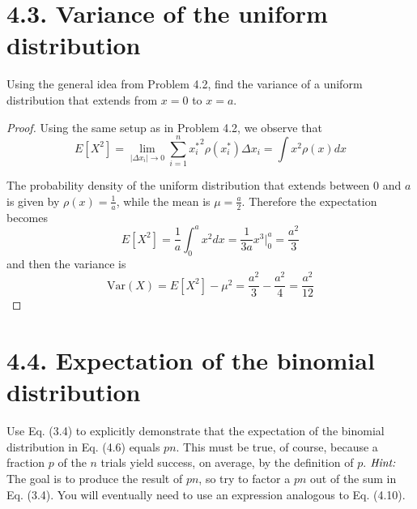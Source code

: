 \section*{4.3. Variance of the uniform distribution}
Using the general idea from Problem 4.2, find the variance of a uniform
distribution that extends from $x = 0$ to $x = a$.

\begin{proof}
    Using the same setup as in Problem 4.2, we observe that
    \[
        E[X^2] = \lim_{|\Delta x_i| \to 0}\sum_{i = 1}^{n} {x_i^*}^2 \rho(x_i^*) \Delta x_i
        = \int x^2\rho(x) dx
    \] 

    The probability density of the uniform distribution that extends
    between $0$ and $a$ is given by $\rho(x) = \frac{1}{a}$, while the mean
     is $\mu = \frac{a}{2}$. Therefore the expectation becomes
     \[
         E[X^2] = \frac{1}{a} \int_0^a x^2 dx = \frac{1}{3a} x^3 \Big|_0^a = \frac{a^2}{3}
     \] 
     and then the variance is
     \[
         \text{Var}(X) = E[X^2] - \mu^2 = \frac{a^2}{3} - \frac{a^2}{4} = \frac{a^2}{12}
     \] 
\end{proof}

\section*{4.4. Expectation of the binomial distribution}
Use Eq. (3.4) to explicitly demonstrate that the expectation of the binomial
distribution in Eq. (4.6) equals $pn$. This must be true, of course, because
a fraction  $p$ of the $n$ trials yield success, on average, by the definition
of $p$. $\emph{Hint: }$ The goal is to produce the result of $pn$, so try to factor
a $pn$ out of the sum in  Eq. (3.4). You will eventually need to use an expression
analogous to Eq. (4.10).

\vspace{1em}

